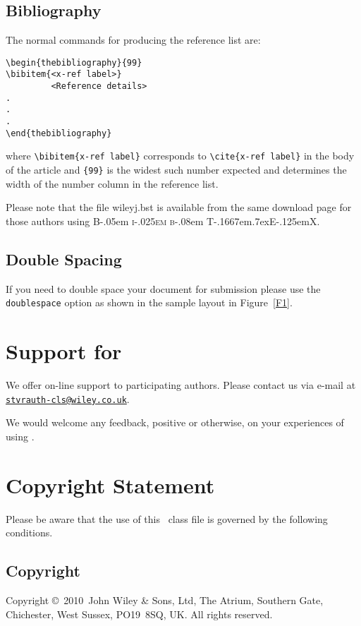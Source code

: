 \documentclass[times]{stvrauth}
\newcommand\BibTeX{{\rmfamily B\kern-.05em \textsc{i\kern-.025em b}\kern-.08em
T\kern-.1667em\lower.7ex\hbox{E}\kern-.125emX}}
\def\volumeyear{2010}
\begin{document}
\subsection{Bibliography}
The normal commands for producing the reference list are:
\begin{verbatim}
\begin{thebibliography}{99}
\bibitem{<x-ref label>}
         <Reference details>
.
.
.
\end{thebibliography}
\end{verbatim}
where \verb"\bibitem{x-ref label}"
corresponds to \verb"\cite{x-ref label}" in the body of the article
and \verb"{99}" is the widest such number expected and determines
the width of the number column in the reference list.

Please note that the file \textsf{wileyj.bst} is available from
the same download page for those authors using \BibTeX.

\subsection{Double Spacing}
If you need to double space your document for submission please
use the \verb+doublespace+ option as shown in the sample layout in
Figure~\ref{F1}.

\section{Support for \textsf{\journalclass}}
We offer on-line support to participating authors. Please contact
us via e-mail at\\
\href{mailto:stvrauth-cls@wiley.co.uk}{\texttt{stvrauth-cls@wiley.co.uk}}.

We would welcome any feedback, positive or otherwise, on your
experiences of using \textsf{\journalclass}.

\section{Copyright Statement}
Please  be  aware that the use of  this \LaTeXe\ class file is
governed by the following conditions.

\subsection{Copyright}
Copyright \copyright\ \volumeyear\ John Wiley \& Sons, Ltd, The
Atrium, Southern Gate, Chichester, West Sussex, PO19~8SQ, UK. All
rights reserved.
\end{document}
